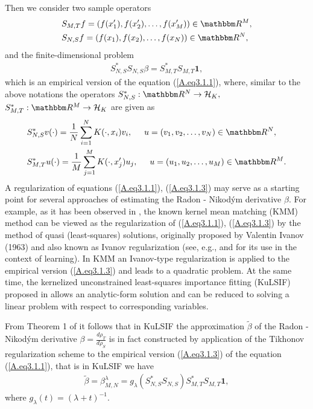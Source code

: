 \documentclass[USenglish]{article}
\def\R{\mathbbm R}
\begin{document}
Then we consider two sample operators
	\begin{align*}
	&S_{M,T} f = (f(x_1'), f(x_2'),\ldots,f(x_M')) \in \R^M,\\
	&S_{N,S} f = (f(x_1), f(x_2),\ldots,f(x_N)) \in \R^N,
	\end{align*}
	and the finite-dimensional problem
	\begin{align}\label{A.eq3.1.3}
	S_{N,S}^* S_{N,S} \beta = S_{M,T}^* S_{M,T} \mathbf{1},
	\end{align}
which is an empirical version of the equation (\ref{A.eq3.1.1}), where, similar to the above notations the operators $S_{N,S}^* : \R^N \rightarrow {\mathcal{H}_K}, $ $S_{M,T}^*: \R^M \rightarrow {\mathcal{H}_K}$ are given as 
\begin{align*}
	&S_{N,S}^* v(\cdot) = \frac{1}{N} \sum_{i = 1}^N K(\cdot, x_i) v_i,\hspace*{0.5cm} u = (v_1,v_2,\ldots,v_N) \in \R^N,\\
	&S_{M,T}^* u(\cdot) = \frac{1}{M} \sum_{j = 1}^M K(\cdot, x_j') u_j, \hspace*{0.5cm} u = (u_1,u_2,\ldots,u_M) \in \R^M.
\end{align*}
A regularization of equations (\ref{A.eq3.1.1}), (\ref{A.eq3.1.3}) may serve as a starting point for several approaches of estimating the Radon - Nikod\'ym derivative $\beta$. For example, as it has been observed in \cite{kanamori2012}, the known kernel mean matching (KMM) method \cite{huang2006} can be viewed as the regularization of (\ref{A.eq3.1.1}), (\ref{A.eq3.1.3}) by the method of quasi (least-squares) solutions, originally proposed by Valentin Ivanov (1963) and also known as Ivanov regularization (see, e.g., \cite{oneto2016} and \cite{page2019} for its use in the context of learning).  In KMM
an Ivanov-type regularization is applied to the empirical version (\ref{A.eq3.1.3}) and  leads to a quadratic problem.  At the same time, the kernelized unconstrained least-squares importance fitting (KuLSIF) proposed in \cite{kanamori2012} allows an analytic-form solution and can be reduced to solving a linear problem with respect to corresponding variables.
	
From Theorem 1 of \cite{kanamori2012} it follows that in KuLSIF the approximation $\tilde{\beta} $ of the Radon - Nikod\'ym derivative $\beta = \frac{d\rho_T}{d\rho_S}$ is in fact constructed by application of the Tikhonov regularization scheme to the empirical version (\ref{A.eq3.1.3}) of the equation (\ref{A.eq3.1.1}), that is in KuLSIF we have 
	\begin{align} \label{A.eq3.1.4}
	\tilde{\beta} = \beta_{M,N}^\lambda = g_\lambda (S_{N,S}^* S_{N,S}) S_{M,T}^*S_{M,T} \mathbf{1},
	\end{align}
	where $g_\lambda (t) = (\lambda + t)^{-1}.$
\end{document}
